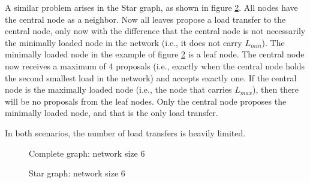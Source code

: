 A similar problem arises in the Star graph, as shown in figure \ref{fig:specialstargraphDemo}. All nodes have the central node as a neighbor. Now all leaves propose a load transfer to the central node, only now with the difference that the central node is not necessarily the minimally loaded node in the network (i.e., it does not carry $L_{min}$). The minimally loaded node in the example of figure \ref{fig:specialstargraphDemo} is a leaf node. The central node now receives a maximum of 4 proposals (i.e., exactly when the central node holds the second smallest load in the network) and accepts exactly one. If the central node is the maximally loaded node (i.e., the node that carries $L_{max}$), then there will be no proposals from the leaf nodes. Only the central node proposes the minimally loaded node, and that is the only load transfer.

In both scenarios, the number of load transfers is heavily limited.
\begin{figure}[]
    \centering
    
    \caption{Complete graph: network size 6}
    \label{fig:specialcompletegraphDemo}
\end{figure}
\begin{figure}[]
    \centering
    
    \caption{Star graph: network size 6}
    \label{fig:specialstargraphDemo}
\end{figure}